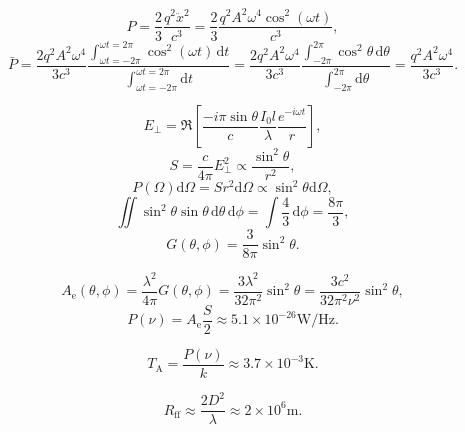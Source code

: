 \documentclass[12pt]{ctexart}
\def\d{\mathrm{d}}
\begin{document}
\begin{equation*}
    P=\frac{2}{3}\frac{q^2\ddot{x}^2}{c^3}
    =\frac{2}{3}\frac{q^2A^2\omega^4\cos^2(\omega t)}{c^3},
\end{equation*}
\begin{equation*}
    \bar{P}=\frac{2q^2A^2\omega^4}{3c^3}\frac{\int_{\omega t=-2\pi}^{\omega t=2\pi}\cos^2(\omega t)\,\d t}{\int_{\omega t=-2\pi}^{\omega t=2\pi}\d t}
    =\frac{2q^2A^2\omega^4}{3c^3}\frac{\int_{-2\pi}^{2\pi}\cos^2\theta\,\d \theta}{\int_{-2\pi}^{2\pi}\d \theta}
    =\frac{q^2A^2\omega^4}{3c^3}.
\end{equation*}

\begin{equation*}
    E_{\bot }=\Re \left[\frac{-i\pi \sin\theta}{c}\frac{I_0l}{\lambda}\frac{e^{-i\omega t}}{r}\right],
\end{equation*}
\begin{equation*}
    S=\frac{c}{4\pi}E_{\bot }^2\propto\frac{\sin^2\theta}{r^2},
\end{equation*}
\begin{equation*}
    P(\Omega)\d\Omega=Sr^2\d\Omega\propto\sin^2\theta\d\Omega,
\end{equation*}
\begin{equation*}
    \iint\sin^2\theta\sin\theta\,\d\theta\,\d\phi
    =\int\frac{4}{3}\,\d\phi=\frac{8\pi}{3},
\end{equation*}
\begin{equation*}
    G(\theta,\phi)=\frac{3}{8\pi}\sin^2\theta.
\end{equation*}

\begin{equation*}
    A_\text{e}(\theta,\phi)
    =\frac{\lambda^2}{4\pi}G(\theta,\phi)
    =\frac{3\lambda^2}{32\pi^2}\sin^2\theta
    =\frac{3c^2}{32\pi^2\nu^2}\sin^2\theta,
\end{equation*}
\begin{equation*}
    P(\nu)=A_\text{e}\frac{S}{2}\approx5.1\times10^{-26}\text{W}/\text{Hz}.
\end{equation*}

\begin{equation*}
    T_\text{A}=\frac{P(\nu)}{k}\approx3.7\times10^{-3}\text{K}.
\end{equation*}

\begin{equation*}
    R_\text{ff}\approx\frac{2D^2}{\lambda}\approx2\times10^{6}\text{m}.
\end{equation*}
\end{document}
